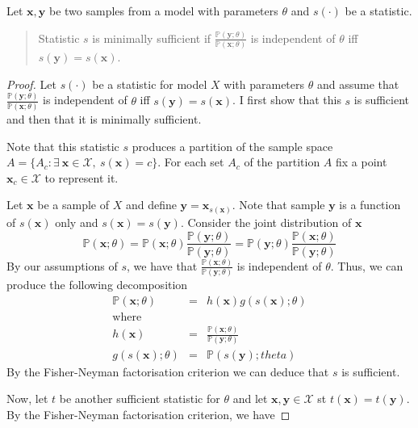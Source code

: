 \documentclass[11pt,a4paper,margin=0]{article}
\newcommand*{\prob}{\mathbb{P}}
\theoremstyle{break}
\begin{document}
  \begin{box_theorem}
    Let $\mathbf{x},\mathbf{y}$ be two samples from a model with parameters $\theta$ and $s(\cdot)$ be a statistic.
    \begin{quote}
      Statistic $s$ is minimally sufficient if $\frac{\prob(\mathbf{y};\theta)}{\prob(\mathbf{x};\theta)}$ is independent of $\theta$ iff $s(\mathbf{y})=s(\mathbf{x})$.
    \end{quote}
    \cite{minimal_sufficiency_lecture_notes}
    \begin{proof}
      Let $s(\cdot)$ be a statistic for model $X$ with parameters $\theta$ and assume that $\frac{\prob(\mathbf{y};\theta)}{\prob(\mathbf{x};\theta)}$ is independent of $\theta$ iff $s(\mathbf{y})=s(\mathbf{x})$. I first show that this $s$ is sufficient and then that it is minimally sufficient.
      \par Note that this statistic $s$ produces a partition of the sample space $A=\{A_c:\exists\ \mathbf{x}\in\mathcal{X},\ s(\mathbf{x})=c\}$. For each set $A_c$ of the partition $A$ fix a point $\mathbf{x}_c\in\mathcal{X}$ to represent it.
      \par Let $\mathbf{x}$ be a sample of $X$ and define $\mathbf{y}=\mathbf{x}_{s(\mathbf{x})}$. Note that sample $\mathbf{y}$ is a function of $s(\mathbf{x})$ only and $s(\mathbf{x})=s(\mathbf{y})$. Consider the joint distribution of $\mathbf{x}$
      \[\prob(\mathbf{x};\theta)=\prob(\mathbf{x};\theta)\frac{\prob(\mathbf{y};\theta)}{\prob(\mathbf{y};\theta)}=\prob(\mathbf{y};\theta)\frac{\prob(\mathbf{x};\theta)}{\prob(\mathbf{y};\theta)} \]
      By our assumptions of $s$, we have that $\frac{\prob(\mathbf{x};\theta)}{\prob(\mathbf{y};\theta)}$ is independent of $\theta$. Thus, we can produce the following decomposition
      \[\begin{array}{rcl}
        \prob(\mathbf{x};\theta)&=&h(\mathbf{x})g(s(\mathbf{x});\theta)\\
        \text{where}&\\
        h(\mathbf{x})&=&\frac{\prob(\mathbf{x};\theta)}{\prob(\mathbf{y};\theta)}\\
        g(s(\mathbf{x});\theta)&=&\prob(s(\mathbf{y});theta)
      \end{array}\]
      By the Fisher-Neyman factorisation criterion we can deduce that $s$ is sufficient.
      \par Now, let $t$ be another sufficient statistic for $\theta$ and let $\mathbf{x},\mathbf{y}\in\mathcal{X}$ st $t(\mathbf{x})=t(\mathbf{y})$. By the Fisher-Neyman factorisation criterion, we have

\end{proof}
\end{box_theorem}
\end{document}
